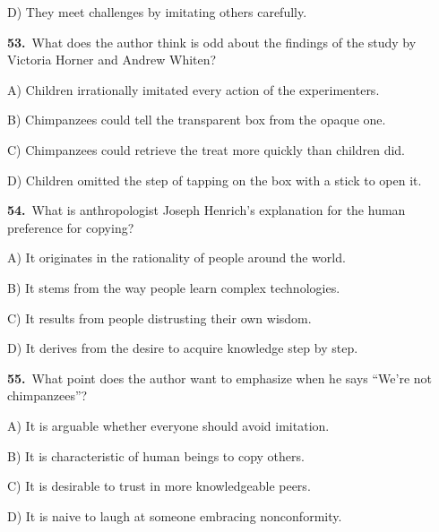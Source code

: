 \noindent\hspace{1.6em}D) They meet challenges by imitating others carefully.\par
\smallskip
\noindent\textbf{53.}\ What does the author think is odd about the findings of the study by Victoria Horner and Andrew Whiten?\par
\noindent\hspace{1.6em}A) Children irrationally imitated every action of the experimenters.\par
\noindent\hspace{1.6em}B) Chimpanzees could tell the transparent box from the opaque one.\par
\noindent\hspace{1.6em}C) Chimpanzees could retrieve the treat more quickly than children did.\par
\noindent\hspace{1.6em}D) Children omitted the step of tapping on the box with a stick to open it.\par
\smallskip
\noindent\textbf{54.}\ What is anthropologist Joseph Henrich's explanation for the human preference for copying?\par
\noindent\hspace{1.6em}A) It originates in the rationality of people around the world.\par
\noindent\hspace{1.6em}B) It stems from the way people learn complex technologies.\par
\noindent\hspace{1.6em}C) It results from people distrusting their own wisdom.\par
\noindent\hspace{1.6em}D) It derives from the desire to acquire knowledge step by step.\par
\smallskip
\noindent\textbf{55.}\ What point does the author want to emphasize when he says ``We're not chimpanzees''?\par
\noindent\hspace{1.6em}A) It is arguable whether everyone should avoid imitation.\par
\noindent\hspace{1.6em}B) It is characteristic of human beings to copy others.\par
\noindent\hspace{1.6em}C) It is desirable to trust in more knowledgeable peers.\par
\noindent\hspace{1.6em}D) It is naive to laugh at someone embracing nonconformity.\par
